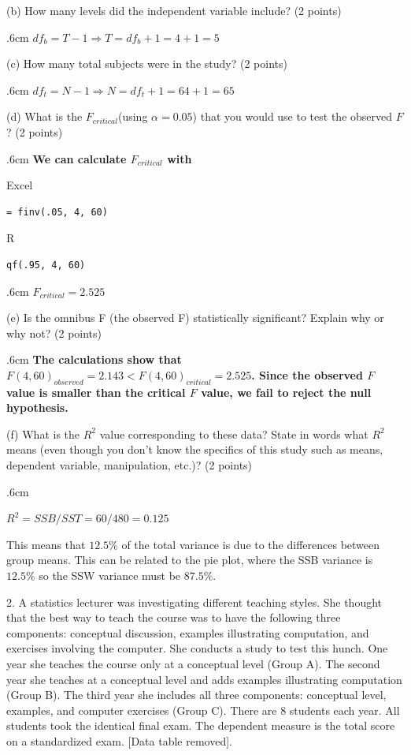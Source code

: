 \documentclass[11pt, oneside]{article}   	%
\newenvironment{answer}{\begin{adjustwidth}{.6cm}{}\bfseries}{\end{adjustwidth}}
\begin{document}
(b) How many levels did the independent variable include? (2 points)

\begin{answer}
$df_b = T - 1 \Rightarrow T = df_b  + 1 = 4 + 1 = 5$
\end{answer}

(c) How many total subjects were in the study? (2 points)
\begin{answer}
$df_t = N - 1  \Rightarrow N = df_t  + 1 = 64 + 1 = 65$
\end{answer}
(d) What is the $F_{critical} $(using $\alpha = 0.05$) that you would use to test the observed $F$? (2 points)
\begin{answer}
We can calculate $F_{critical}$ with
\end{answer}
Excel
\begin{lstlisting}
= finv(.05, 4, 60)
\end{lstlisting}
R
\begin{lstlisting}[language=Rplus]
qf(.95, 4, 60)
\end{lstlisting}
\begin{answer}
$F_{critical} = 2.525$
\end{answer}
(e) Is the omnibus F (the observed F) statistically significant? Explain why or why not? (2 points)
\begin{answer}
The calculations show that $F(4,60)_{observed} = 2.143 < F(4,60)_{critical} = 2.525$. Since the observed $F$ value is smaller than the critical $F$ value, we fail to reject the null hypothesis. 
\end{answer}
(f)  What is the $R^2$ value corresponding to these data? State in words what $R^2$ means (even though you don't know the specifics of this study such as means, dependent variable, manipulation, etc.)? (2 points)

\begin{answer}

$R^2 = SSB / SST = 60 / 480 = 0.125$

This means that $12.5\%$ of the total variance is due to the differences between group means. This can be related to the pie plot, where the SSB variance is $12.5\%$ so the SSW variance must be $87.5\%$. 

\end{answer}

2. A statistics lecturer was investigating different teaching styles. She thought that the best way to teach the course was to have the following three components: conceptual discussion, examples illustrating computation, and exercises involving the computer. She conducts a study to test this hunch. One year she teaches the course only at a conceptual level (Group A). The second year she teaches at a conceptual level and adds examples illustrating computation (Group B). The third year she includes all three components: conceptual level, examples, and computer exercises (Group C). There are 8 students each year. All students took the identical final exam. The dependent measure is the total score on a standardized exam. [Data table removed].
\end{document}
